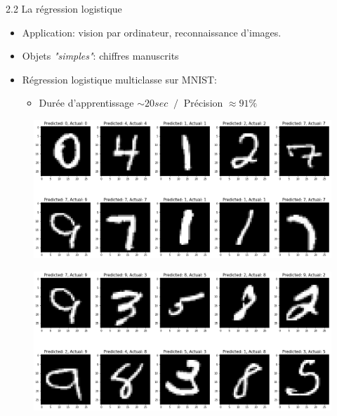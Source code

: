 \begin{frame}{2.2 La régression logistique}
  \begin{itemize}
  \item Application: vision par ordinateur, reconnaissance d'images.
  \item Objets \textit{"simples"}: chiffres manuscrits
  \item Régression logistique multiclasse sur MNIST:
    \begin{itemize}
      \normalsize
    \item Durée d'apprentissage $\sim 20 sec$ $~/~$ Précision $\approx 91\%$
    \end{itemize}
  \end{itemize}
  \vfill
  \begin{minipage}{0.45\textwidth}
    \begin{figure}
      \includegraphics[height=0.37\textheight]{figs/digitReco_regrLog.png}
    \end{figure}
  \end{minipage}
  \hfill
  \begin{minipage}{0.45\textwidth}
    \begin{figure}
      \includegraphics[height=0.37\textheight]{figs/bad_digitReco_regrLog.png}
    \end{figure}
  \end{minipage}
\end{frame}

